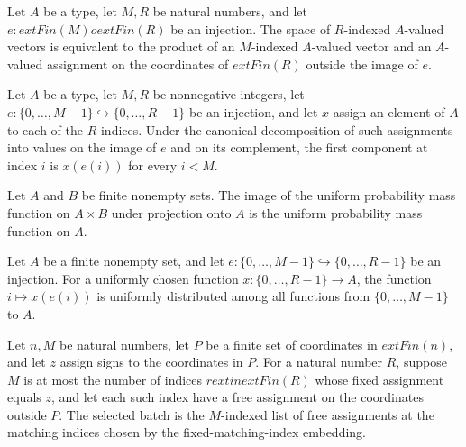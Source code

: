\begin{definition}
\label{FABL.injectionVectorSplitEquiv}
\leanok
Let $A$ be a type, let $M,R$ be natural numbers, and let $e:	ext{Fin}(M)	o	ext{Fin}(R)$
be an injection. The space of $R$-indexed $A$-valued vectors is equivalent to the
product of an $M$-indexed $A$-valued vector and an $A$-valued assignment on the
coordinates of $	ext{Fin}(R)$ outside the image of $e$.
\end{definition}

\begin{theorem}
\label{FABL.injectionVectorSplitEquiv_fst}
\leanok
{}
Let $A$ be a type, let $M,R$ be nonnegative integers, let
$e:\{0,\ldots,M-1\}\hookrightarrow\{0,\ldots,R-1\}$ be an injection, and let $x$ assign
an element of $A$ to each of the $R$ indices. Under the canonical decomposition of such
assignments into values on the image of $e$ and on its complement, the first component
at index $i$ is $x(e(i))$ for every $i<M$.
\end{theorem}

\begin{theorem}
\label{FABL.map_uniformPMF_fst}
\leanok
{}
Let $A$ and $B$ be finite nonempty sets. The image of the uniform probability mass
function on $A\times B$ under projection onto $A$ is the uniform probability mass
function on $A$.
\end{theorem}

\begin{theorem}
\label{FABL.map_uniformPMF_injection_projection}
\leanok
{}
Let $A$ be a finite nonempty set, and let
$e:\{0,\ldots,M-1\}\hookrightarrow\{0,\ldots,R-1\}$ be an injection. For a uniformly
chosen function $x:\{0,\ldots,R-1\}\to A$, the function $i\mapsto x(e(i))$ is uniformly
distributed among all functions from $\{0,\ldots,M-1\}$ to $A$.
\end{theorem}

\begin{definition}
\label{FABL.selectedJuntaFreeBatch}
\leanok
{}
Let $n,M$ be natural numbers, let $P$ be a finite set of coordinates in $	ext{Fin}(n)$,
and let $z$ assign signs to the coordinates in $P$. For a natural number $R$, suppose
$M$ is at most the number of indices $r	ext{ in }	ext{Fin}(R)$ whose fixed assignment
equals $z$, and let each such index have a free assignment on the coordinates outside
$P$. The selected batch is the $M$-indexed list of free assignments at the matching
indices chosen by the fixed-matching-index embedding.
\end{definition}

